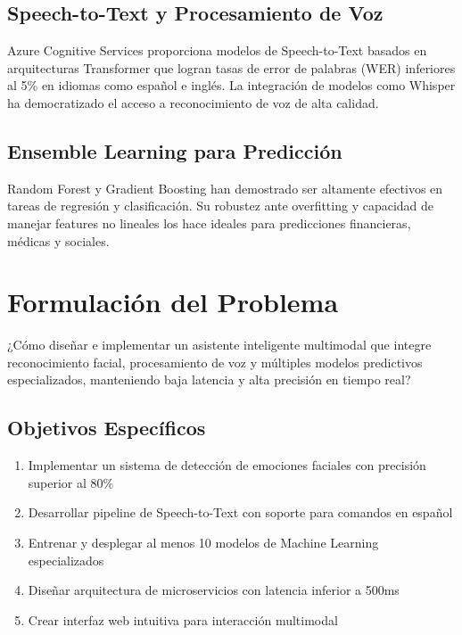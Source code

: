 \subsection{Speech-to-Text y Procesamiento de Voz}

Azure Cognitive Services \cite{azure2023speech} proporciona modelos de Speech-to-Text basados en arquitecturas Transformer que logran tasas de error de palabras (WER) inferiores al 5\% en idiomas como español e inglés. La integración de modelos como Whisper \cite{radford2022whisper} ha democratizado el acceso a reconocimiento de voz de alta calidad.

\subsection{Ensemble Learning para Predicción}

Random Forest y Gradient Boosting han demostrado ser altamente efectivos en tareas de regresión y clasificación. Su robustez ante overfitting y capacidad de manejar features no lineales los hace ideales para predicciones financieras, médicas y sociales.

\section{Formulación del Problema}

¿Cómo diseñar e implementar un asistente inteligente multimodal que integre reconocimiento facial, procesamiento de voz y múltiples modelos predictivos especializados, manteniendo baja latencia y alta precisión en tiempo real?

\subsection{Objetivos Específicos}

\begin{enumerate}
    \item Implementar un sistema de detección de emociones faciales con precisión superior al 80\%
    \item Desarrollar pipeline de Speech-to-Text con soporte para comandos en español
    \item Entrenar y desplegar al menos 10 modelos de Machine Learning especializados
    \item Diseñar arquitectura de microservicios con latencia inferior a 500ms
    \item Crear interfaz web intuitiva para interacción multimodal
\end{enumerate}